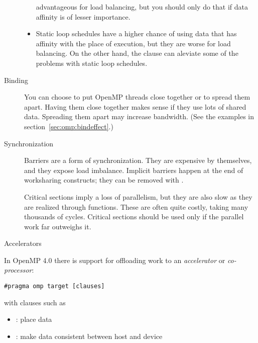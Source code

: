 \begin{description}
\begin{itemize}
    advantageous for load balancing, but you should only do that if
    data affinity is of lesser importance.
  \item Static loop schedules have a higher chance of using data that
    has affinity with the place of execution, but they are worse for
    load balancing. On the other hand, the  clause
    can aleviate some of the problems with static loop schedules.
  \end{itemize}
\item[Binding] You can choose to put OpenMP threads close together or
  to spread them apart. Having them close together makes sense if they
  use lots of shared data. Spreading them apart may increase
  bandwidth. (See the examples in section~\ref{sec:omp:bindeffect}.)
\item[Synchronization] Barriers are a form of synchronization. They
  are expensive by themselves, and they expose load
  imbalance. Implicit barriers happen at the end of worksharing
  constructs; they can be removed with .

  Critical sections imply a loss of parallelism, but they are also
  slow as they are realized through 
  functions. These are often quite costly, taking many thousands of
  cycles.  Critical sections should be used only if the parallel work
  far outweighs it.
\end{description}

 {Accelerators}

In OpenMP 4.0 there is support for offloading work to an
\emph{accelerator}
or
\emph{co-processor}:
\begin{verbatim}
#pragma omp target [clauses]
\end{verbatim}
with clauses such as
\begin{itemize}
\item {}: place data
\item {}: make data consistent between host and device
\end{itemize}

\endinput

\Level 0 {Idioms}

\Level 1 {While loops}

\verbatimsnippet{linkedlist}

